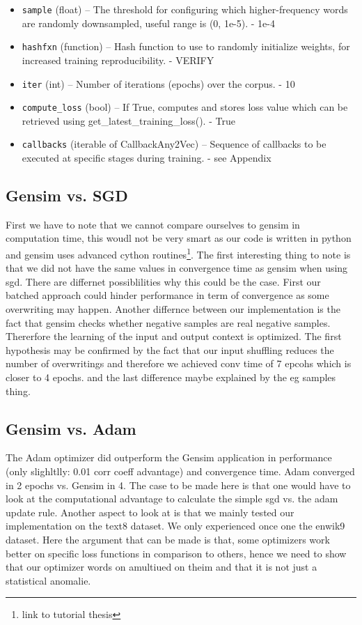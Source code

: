 \begin{itemize}
 \item   \texttt{sample} (float) – The threshold for configuring which higher-frequency words are randomly downsampled, useful range is (0, 1e-5). - 1e-4
   \item \texttt{hashfxn} (function) – Hash function to use to randomly initialize weights, for increased training reproducibility. - VERIFY 
  \item  \texttt{iter} (int) – Number of iterations (epochs) over the corpus. - 10 
 \
  \item  \texttt{compute\_loss} (bool) – If True, computes and stores loss value which can be retrieved using get\_latest\_training\_loss(). - True
 \item   \texttt{callbacks} (iterable of CallbackAny2Vec) – Sequence of callbacks to be executed at specific stages during training. - see Appendix
\end{itemize}

\subsection{Gensim vs. SGD}
First we have to note that we cannot compare ourselves to gensim in computation time, this woudl not be very smart as our code is written in python and gensim uses advanced cython routines\footnote{link to tutorial thesis}. 
The first interesting thing to note is that we did not have the same values in convergence time as gensim when using sgd. There are differnet possiblilities why this could be the case. First our batched approach could hinder performance in term of convergence as some overwriting may happen. Another differnce between our implementation is the fact that gensim checks whether negative samples are real negative samples. Thererfore the learning of the input and output context is optimized. 
The first hypothesis may be confirmed by the fact that our input shuffling reduces the number of overwritings and therefore we achieved conv time of 7 epcohs which is closer to 4 epochs. and the last difference maybe explained by the eg samples thing. 

\subsection{Gensim vs. Adam}
The Adam optimizer did outperform the Gensim application in performance (only slighltlly: 0.01 corr coeff advantage) and convergence time. Adam converged in 2 epochs vs. Gensim in 4. The case to be made here is that one would have to look at the computational advantage to calculate the simple sgd vs.  the adam update rule. Another aspect to look at is that we mainly tested our implementation on the text8 dataset. We only experienced once one the enwik9 dataset. Here the argument that can be made is that, some optimizers work better on specific loss functions in comparison to others, hence we need to show that our optimizer words on amultiued on theim and that it is not just a statistical anomalie. 

